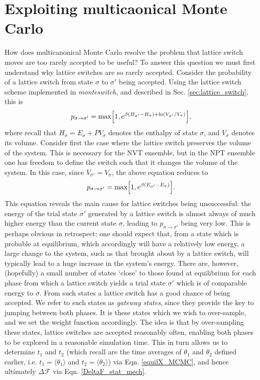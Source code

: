 \documentclass{report}
\begin{document}
\section{Exploiting multicaonical Monte Carlo}
How does multicanonical Monte Carlo resolve the problem that lattice switch moves are too rarely accepted to be useful? To answer this question we must 
first understand why lattice switches are so rarely accepted. 
Consider the probability of a lattice switch from state $\sigma$ to $\sigma'$ being accepted. Using the lattice switch scheme implemented in
\emph{monteswitch}, and described in Sec. \ref{sec:lattice_switch}, this is
\begin{equation}\label{p_LSMC_NPT}
p_{\sigma\to\sigma'}=\text{max}\Bigl[1,e^{\beta(H_{\sigma'}-H_{\sigma})+\ln(V_{\sigma'}/V_{\sigma})}\Bigr],
\end{equation}
where recall that $H_{\sigma}=E_{\sigma}+PV_{\sigma}$ denotes the enthalpy of state $\sigma$, and $V_{\sigma}$ denotes its volume. Consider first the
case where the lattice switch preserves the volume of the system. This is necessary for the NVT ensemble, but in the NPT ensemble one has freedom to
define the switch such that it changes the volume of the system. In this case, since $V_{\sigma'}=V_{\sigma}$, the above equation reduces to
\begin{equation}\label{p_LSMC_NVT}
p_{\sigma\to\sigma'}=\text{max}\Bigl[1,e^{\beta(E_{\sigma'}-E_{\sigma})}\Bigr].
\end{equation}
This equation reveals the main cause for lattice switches being unsuccessful: the energy of the trial state $\sigma'$ generated by a 
lattice switch is almost always of much higher energy than the current state $\sigma$, leading to $p_{\sigma\to\sigma'}$ being very low. 
This is perhaps obvious in retrospect: one should expect that,
from a state which is probable at equilibrium, which accordingly will have a relatively low energy, a large change to the system, such as that 
brought about by a lattice switch, will typically lead to a huge increase in the system's energy. 
%
There are, however, (hopefully) a small number of states `close' to those found at equilibrium for each phase from which a lattice switch yields a 
trial state $\sigma'$ which is of comparable energy to $\sigma$. From such states a lattice switch has a good chance of being accepted.
We refer to such states as \emph{gateway states}, since they provide the key to jumping between both phases. It is these states which we wish to over-sample,
and we set the weight function accordingly. The idea is that by over-sampling these states, lattice switches are accepted reasonably often, 
enabling both phases to be explored in a reasonable simulation time. This in turn allows us to determine
$t_1$ and $t_2$ (which recall are the time averages of $\theta_1$ and $\theta_2$ defined earlier, i.e. $t_1=\langle\theta_1\rangle$ and 
$t_2=\langle\theta_2\rangle$) via Eqn. \eqref{equilX_MCMC}, and hence ultimately $\Delta \mathcal{F}$ via Eqn. \eqref{DeltaF_stat_mech}.
\end{document}

